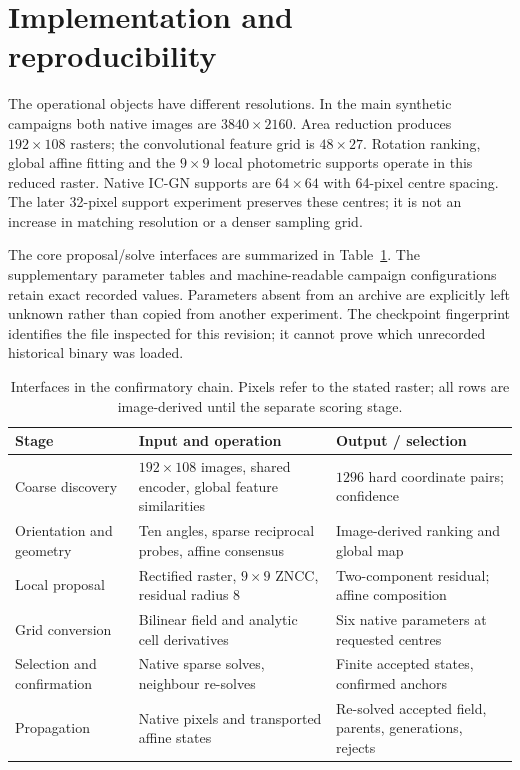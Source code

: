 \section{Implementation and reproducibility}
The operational objects have different resolutions. In the main synthetic campaigns both native images are $3840\times2160$. Area reduction produces $192\times108$ rasters; the convolutional feature grid is $48\times27$. Rotation ranking, global affine fitting and the $9\times9$ local photometric supports operate in this reduced raster. Native IC-GN supports are $64\times64$ with 64-pixel centre spacing. The later 32-pixel support experiment preserves these centres; it is not an increase in matching resolution or a denser sampling grid.

The core proposal/solve interfaces are summarized in Table~\ref{tab:interfaces}. The supplementary parameter tables and machine-readable campaign configurations retain exact recorded values. Parameters absent from an archive are explicitly left unknown rather than copied from another experiment. The checkpoint fingerprint identifies the file inspected for this revision; it cannot prove which unrecorded historical binary was loaded.

\begin{table}[tb]\centering\small
\caption{Interfaces in the confirmatory chain. Pixels refer to the stated raster; all rows are image-derived until the separate scoring stage.}\label{tab:interfaces}
\begin{tabular}{p{.19\linewidth}p{.34\linewidth}p{.36\linewidth}}\toprule
Stage & Input and operation & Output / selection\\\midrule
Coarse discovery & $192\times108$ images, shared encoder, global feature similarities & $1296$ hard coordinate pairs; confidence\\
Orientation and geometry & Ten angles, sparse reciprocal probes, affine consensus & Image-derived ranking and global map\\
Local proposal & Rectified raster, $9\times9$ ZNCC, residual radius 8 & Two-component residual; affine composition\\
Grid conversion & Bilinear field and analytic cell derivatives & Six native parameters at requested centres\\
Selection and confirmation & Native sparse solves, neighbour re-solves & Finite accepted states, confirmed anchors\\
Propagation & Native pixels and transported affine states & Re-solved accepted field, parents, generations, rejects\\\bottomrule
\end{tabular}\end{table}


